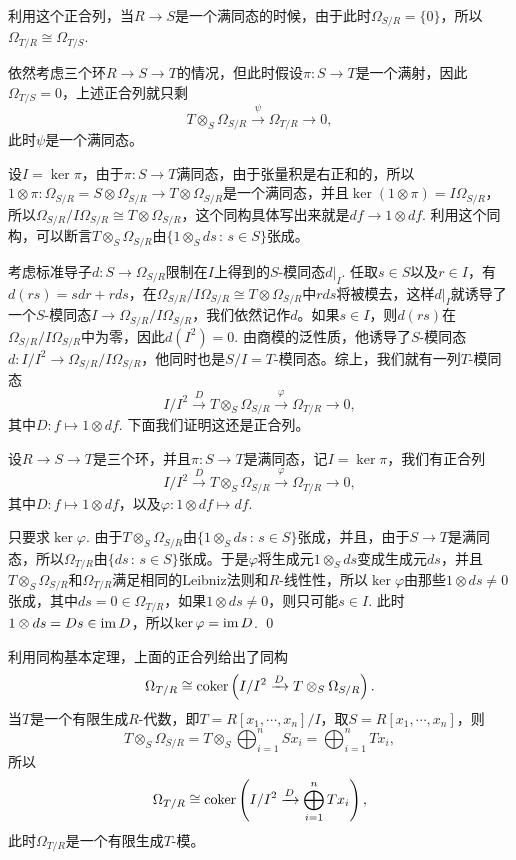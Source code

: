 利用这个正合列，当$R\to S$是一个满同态的时候，由于此时$\Omega_{S/R}=\{0\}$，所以$\Omega_{T/R}\cong \Omega_{T/S}$.

\para 依然考虑三个环$R\to S\to T$的情况，但此时假设$\pi:S\to T$是一个满射，因此$\Omega_{T/S}=0$，上述正合列就只剩
\[
	T\otimes_S \Omega_{S/R}\xrightarrow{\psi} \Omega_{T/R}\to 0,
\]
此时$\psi$是一个满同态。

设$I=\ker \pi$，由于$\pi:S\to T$满同态，由于张量积是右正和的，所以$1\otimes \pi:\Omega_{S/R}=S\otimes\Omega_{S/R}\to T\otimes\Omega_{S/R}$是一个满同态，并且$\ker(1\otimes \pi)=I\Omega_{S/R}$，所以$\Omega_{S/R}/I\Omega_{S/R}\cong T\otimes\Omega_{S/R}$，这个同构具体写出来就是$df\to 1\otimes df$. 利用这个同构，可以断言$T\otimes_S\Omega_{S/R}$由$\{1\otimes_S ds\,:\,s\in S\}$张成。

考虑标准导子$d:S\to \Omega_{S/R}$限制在$I$上得到的$S$-模同态$d|_I$. 任取$s\in S$以及$r\in I$，有$d(rs)=sdr+rds$，在$\Omega_{S/R}/I\Omega_{S/R}\cong T\otimes\Omega_{S/R}$中$rds$将被模去，这样$d|_I$就诱导了一个$S$-模同态$I\to \Omega_{S/R}/I\Omega_{S/R}$，我们依然记作$d$。如果$s\in I$，则$d(rs)$在$\Omega_{S/R}/I\Omega_{S/R}$中为零，因此$d(I^2)=0$. 由商模的泛性质，他诱导了$S$-模同态$d:I/I^2\to \Omega_{S/R}/I\Omega_{S/R}$，他同时也是$S/I=T$-模同态。综上，我们就有一列$T$-模同态
\[
	I/I^2\xrightarrow{D} T\otimes_S\Omega_{S/R}\xrightarrow{\varphi} \Omega_{T/R}\to 0,
\]
其中$D:f\mapsto 1\otimes df$. 下面我们证明这还是正合列。

\pro 设$R\to S\to T$是三个环，并且$\pi:S\to T$是满同态，记$I=\ker\pi$，我们有正合列
\[
	I/I^2\xrightarrow{D} T\otimes_S\Omega_{S/R}\xrightarrow{\varphi} \Omega_{T/R}\to 0,
\]
其中$D:f\mapsto 1\otimes df$，以及$\varphi:1\otimes df\mapsto df$.

\proof
	只要求$\ker \varphi$. 由于$T\otimes_S\Omega_{S/R}$由$\{1\otimes_S ds\,:\,s\in S\}$张成，并且，由于$S\to T$是满同态，所以$\Omega_{T/R}$由$\{ds\,:\,s\in S\}$张成。于是$\varphi$将生成元$1\otimes_S ds$变成生成元$ds$，并且$T\otimes_S\Omega_{S/R}$和$\Omega_{T/R}$满足相同的Leibniz法则和$R$-线性性，所以$\ker \varphi$由那些$1\otimes ds\neq 0$张成，其中$ds=0\in\Omega_{T/R}$，如果$1\otimes ds\neq 0$，则只可能$s\in I$. 此时$1\otimes ds=Ds\in\operatorname{im} D$，所以$\ker\varphi=\operatorname{im} D$. 
\qed

利用同构基本定理，上面的正合列给出了同构
\[
	\Omega_{T/R}\cong \operatorname{coker}\left(I/I^2\xrightarrow{D} T\otimes_S\Omega_{S/R}\right).
\]
当$T$是一个有限生成$R$-代数，即$T=R[x_1,\cdots,x_n]/I$，取$S=R[x_1,\cdots,x_n]$，则
\[
	T\otimes_S\Omega_{S/R}=T\otimes_S\bigoplus_{i=1}^n Sx_i=\bigoplus_{i=1}^n Tx_i,
\]
所以
\[
	\Omega_{T/R}\cong \operatorname{coker}\left(I/I^2\xrightarrow{D} \bigoplus_{i=1}^n Tx_i\right),
\]
此时$\Omega_{T/R}$是一个有限生成$T$-模。